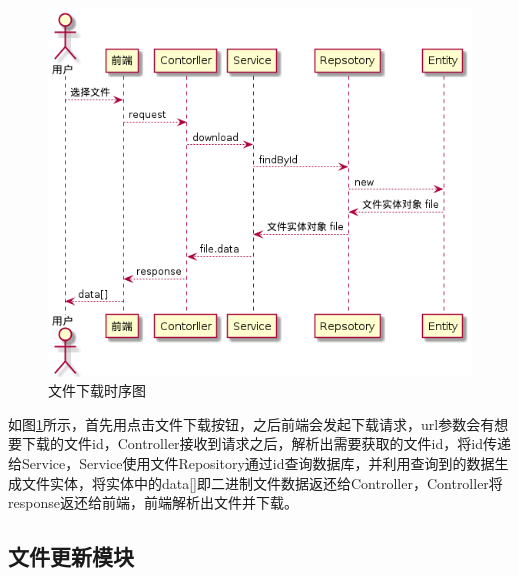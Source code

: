 \begin{figure}[H]
    \centering
    \includegraphics[scale = 0.6]{out/uml/时序图/file-download-sequence/file-download-sequence.png}
    \caption{\song\wuhao 文件下载时序图}
    \label{file-download-sequence}
\end{figure}

如图\ref{file-download-sequence}所示，首先用点击文件下载按钮，之后前端会发起下载请求，url参数会有想要下载的文件id，Controller接收到请求之后，解析出需要获取的文件id，将id传递给Service，Service使用文件Repository通过id查询数据库，并利用查询到的数据生成文件实体，将实体中的data[]即二进制文件数据返还给Controller，Controller将response返还给前端，前端解析出文件并下载。

\subsection{文件更新模块}

